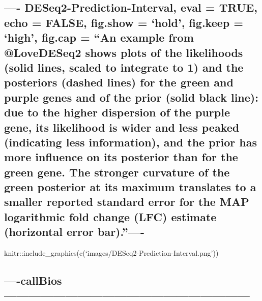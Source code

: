 \documentclass[]{article}
\begin{document}
\subsection{\texorpdfstring{---- DESeq2-Prediction-Interval, eval =
TRUE, echo = FALSE, fig.show = `hold', fig.keep = `high', fig.cap = ``An
example from @LoveDESeq2 shows plots of the likelihoods (solid lines,
scaled to integrate to 1) and the posteriors (dashed lines) for the
green and purple genes and of the prior (solid black line): due to the
higher dispersion of the purple gene, its likelihood is wider and less
peaked (indicating less information), and the prior has more influence
on its posterior than for the green gene. The stronger curvature of the
green posterior at its maximum translates to a smaller reported standard
error for the MAP logarithmic fold change (LFC) estimate (horizontal
error
bar).''----}{---- DESeq2-Prediction-Interval, eval = TRUE, echo = FALSE, fig.show = hold, fig.keep = high, fig.cap = An example from @LoveDESeq2 shows plots of the likelihoods (solid lines, scaled to integrate to 1) and the posteriors (dashed lines) for the green and purple genes and of the prior (solid black line): due to the higher dispersion of the purple gene, its likelihood is wider and less peaked (indicating less information), and the prior has more influence on its posterior than for the green gene. The stronger curvature of the green posterior at its maximum translates to a smaller reported standard error for the MAP logarithmic fold change (LFC) estimate (horizontal error bar).----}}\label{deseq2-prediction-interval-eval-true-echo-false-fig.show-hold-fig.keep-high-fig.cap-an-example-from-lovedeseq2-shows-plots-of-the-likelihoods-solid-lines-scaled-to-integrate-to-1-and-the-posteriors-dashed-lines-for-the-green-and-purple-genes-and-of-the-prior-solid-black-line-due-to-the-higher-dispersion-of-the-purple-gene-its-likelihood-is-wider-and-less-peaked-indicating-less-information-and-the-prior-has-more-influence-on-its-posterior-than-for-the-green-gene.-the-stronger-curvature-of-the-green-posterior-at-its-maximum-translates-to-a-smaller-reported-standard-error-for-the-map-logarithmic-fold-change-lfc-estimate-horizontal-error-bar.-}

knitr::include\_graphics(c(`images/DESeq2-Prediction-Interval.png'))

\subsection{----callBios------------------------------------------------------------}\label{callbios}
\end{document}
